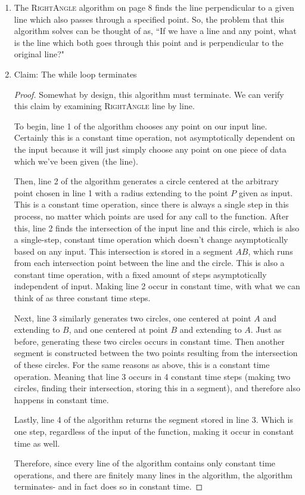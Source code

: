 \documentclass{article}
\begin{document}
\begin{enumerate}
	\item The \textsc{RightAngle} algorithm on page 8 finds the line perpendicular to a given line which 
		also passes through a specified point. So, the problem that this algorithm
		solves can be thought of as, ``If we have a line and any point, what is the line
		which both goes through this point and is perpendicular to the original line?"
	\item Claim: The while loop terminates
		\begin{proof}
			Somewhat by design, this algorithm must terminate. We can verify this claim by
			examining \textsc{RightAngle} line by line.

			To begin, line 1 of the algorithm chooses any point on our input line. Certainly
			this is a constant time operation, not asymptotically dependent on the input
			because it will just simply choose any point on one piece of data which we've been given
			(the line).

			Then, line 2 of the algorithm generates a circle centered at the arbitrary point chosen in
			line 1 with a radius extending to the point $P$ given as input. This is a constant time operation,
			since there is always a single step in this process, no matter which points are used for any call to
			the function. After this, line 2 finds the intersection of the input line and this circle, which is
			also a single-step, constant time operation which doesn't change asymptotically based on any input.
			This intersection is stored in a segment $AB$, which runs from each intersection point between the line 
			and the circle. This is also a constant time operation, with a fixed amount of
			steps asymptotically independent of input. Making line 2 occur in constant time, with what we 
			can think of as three constant time steps.
			
			Next, line 3 similarly generates two circles, one centered at point $A$ and extending to $B$, and one
			centered at point $B$ and extending to $A$. Just as before, generating these two circles occurs in constant
			time. Then another segment is constructed between the two points resulting from the intersection of these
			circles. For the same reasons as above, this is a constant time operation. Meaning that line 3 occurs in 4
			constant time steps (making two circles, finding their intersection, storing this in a segment), 
			and therefore also happens in constant time.

			Lastly, line 4 of the algorithm returns the segment stored in line 3. Which is one step, regardless of the input
			of the function, making it occur in constant time as well.

			Therefore, since every line of the algorithm contains only constant time operations, and there are finitely
			many lines in the algorithm, the algorithm terminates- and in fact does so in constant time.

		\end{proof}
\end{enumerate}
\end{document}
